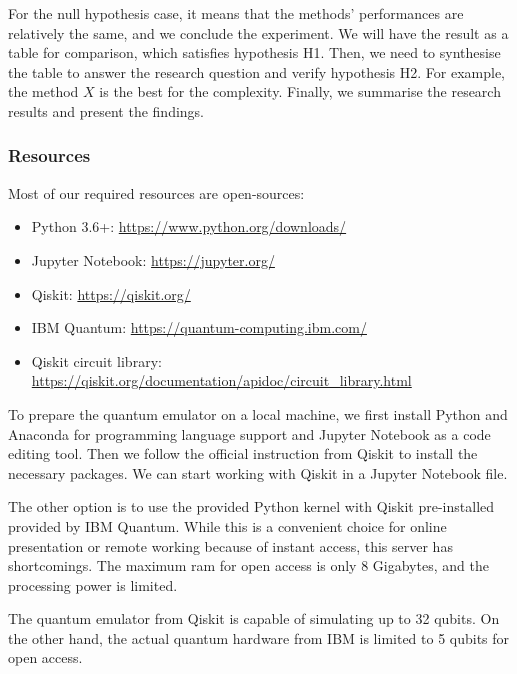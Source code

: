 For the null hypothesis case, it means that the methods' performances are relatively the same, and we conclude the experiment.
We will have the result as a table for comparison, which satisfies hypothesis H1.
Then, we need to synthesise the table to answer the research question and verify hypothesis H2.
For example, the method $X$ is the best for the complexity.
Finally, we summarise the research results and present the findings.

\subsubsection{Resources} \label{Resources section}
Most of our required resources are open-sources:
\begin{itemize}
    \item Python 3.6+: \url{https://www.python.org/downloads/}
    \item Jupyter Notebook: \url{https://jupyter.org/}
    \item Qiskit: \url{https://qiskit.org/}
    \item IBM Quantum: \url{https://quantum-computing.ibm.com/}
    \item Qiskit circuit library: \url{https://qiskit.org/documentation/apidoc/circuit_library.html}
\end{itemize}

To prepare the quantum emulator on a local machine, we first install Python and Anaconda for programming language support and Jupyter Notebook as a code editing tool.
Then we follow the official instruction from Qiskit \cite{Qiskit} to install the necessary packages.
We can start working with Qiskit in a Jupyter Notebook file.

The other option is to use the provided Python kernel with Qiskit pre-installed provided by IBM Quantum.
While this is a convenient choice for online presentation or remote working because of instant access, this server has shortcomings.
The maximum ram for open access is only 8 Gigabytes, and the processing power is limited.

The quantum emulator from Qiskit is capable of simulating up to 32 qubits.
On the other hand, the actual quantum hardware from IBM is limited to 5 qubits for open access.

